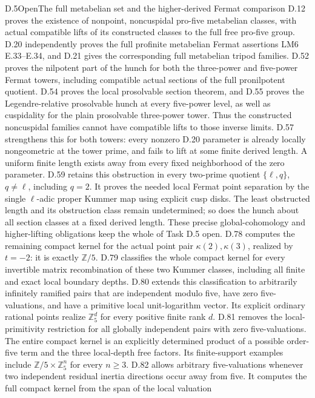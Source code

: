 \begin{statement}{D.5}{Open}{The full metabelian set and the higher-derived Fermat comparison}
D.12 proves the existence of nonpoint,
noncuspidal pro-five metabelian classes,
with actual compatible lifts of its constructed
classes to the full free pro-five group.
D.20 independently proves the full profinite
metabelian Fermat assertions LM6 E.33--E.34,
and D.21 gives the corresponding full
metabelian tripod families. D.52 proves the
nilpotent part of the hunch for both the
three-power and five-power Fermat towers,
including compatible actual sections of
the full pronilpotent quotient. D.54 proves
the local prosolvable section theorem, and
D.55 proves the Legendre-relative prosolvable
hunch at every five-power level, as well as
cuspidality for the plain prosolvable
three-power tower. Thus the constructed
noncuspidal families cannot have compatible
lifts to those inverse limits. D.57 strengthens
this for both towers: every nonzero D.20
parameter is already locally nongeometric
at the tower prime, and fails to lift at
some finite derived length. A uniform
finite length exists away from every
fixed neighborhood of the zero parameter.
D.59 retains this obstruction in every
two-prime quotient \(\{\ell,q\}\),
\(q\ne\ell\), including \(q=2\).
It proves the needed local Fermat point
separation by the single \(\ell\)-adic
proper Kummer map using explicit cusp disks.
The least obstructed length and its
obstruction class remain undetermined;
so does the hunch about all section
classes at a fixed derived length. These precise
global-cohomology and higher-lifting
obligations keep the whole of Task D.5 open.
D.78 computes the remaining compact kernel for the actual
point pair \(\kappa(2),\kappa(3)\), realized by \(t=-2\):
it is exactly \(\mathbb Z/5\). D.79 classifies the whole
compact kernel for every invertible matrix recombination of
these two Kummer classes, including all finite and exact
local boundary depths. D.80 extends this classification to
arbitrarily infinitely ramified pairs that are independent
modulo five, have zero five-valuations, and have a primitive
local unit-logarithm vector. Its explicit ordinary rational
points realize \(\mathbb Z_5^d\) for every positive finite
rank \(d\). D.81 removes the local-primitivity restriction
for all globally independent pairs with zero five-valuations.
The entire compact kernel is an explicitly determined product
of a possible order-five term and the three local-depth free
factors. Its finite-support examples include
\(\mathbb Z/5\times\mathbb Z_5^n\) for every \(n\ge3\).
D.82 allows arbitrary five-valuations whenever two independent
residual inertia directions occur away from five. It computes
the full compact kernel from the span of the local valuation

\end{statement}
